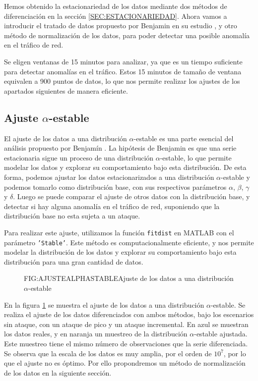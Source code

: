Hemos obtenido la estacionariedad de los datos mediante dos métodos de diferenciación en la sección \ref{SEC:ESTACIONARIEDAD}. Ahora vamos a introducir el tratado de datos propuesto por Benjamin en su estudio \cite{benjamin2019}, y otro método de normalización de los datos, para poder detectar una posible anomalía en el tráfico de red.

Se eligen ventanas de 15 minutos para analizar, ya que es un tiempo suficiente para detectar anomalías en el tráfico. Estos 15 minutos de tamaño de ventana equivalen a 900 puntos de datos, lo que nos permite realizar los ajustes de los apartados siguientes de manera eficiente.

\subsection{Ajuste $\alpha$-estable}
El ajuste de los datos a una distribución $\alpha$-estable es una parte esencial del análisis propuesto por Benjamín \cite{benjamin2021}. La hipótesis de Benjamin es que una serie estacionaria sigue un proceso de una distribución $\alpha$-estable, lo que permite modelar los datos y explorar su comportamiento bajo esta distribución.
De esta forma, podemos ajustar los datos estacionarizados a una distribución $\alpha$-estable y podemos tomarlo como distribución base, con sus respectivos parámetros $\alpha$, $\beta$, $\gamma$ y $\delta$.
Luego se puede comparar el ajuste de otros datos con la distribución base, y detectar si hay alguna anomalía en el tráfico de red, suponiendo que la distribución base no esta sujeta a un ataque.

Para realizar este ajuste, utilizamos la función \texttt{fitdist} en MATLAB con el parámetro \texttt{'Stable'}. Este método es computacionalmente eficiente, y nos permite modelar la distribución de los datos y explorar su comportamiento bajo esta distribución para una gran cantidad de datos.

\begin{figure}[Ajuste de los datos a una distribución $\alpha$-estable]{FIG:AJUSTEALPHASTABLE}{Ajuste de los datos a una distribución $\alpha$-estable}
    \label{FIG:AJUSTEALPHASTABLE}
\end{figure}

En la figura \ref{FIG:AJUSTEALPHASTABLE} se muestra el ajuste de los datos a una distribución $\alpha$-estable. Se realiza el ajuste de los datos diferenciados con ambos métodos, bajo los escenarios sin ataque, con un ataque de pico y un ataque incremental. En azul se muestran los datos reales, y en naranja un muestreo de la distribución $\alpha$-estable ajustada. Este muestreo tiene el mismo número de observaciones que la serie diferenciada.
Se observa que la escala de los datos es muy amplia, por el orden de $10^7$, por lo que el ajuste no es óptimo. Por ello propondremos un método de normalización de los datos en la siguiente sección.

